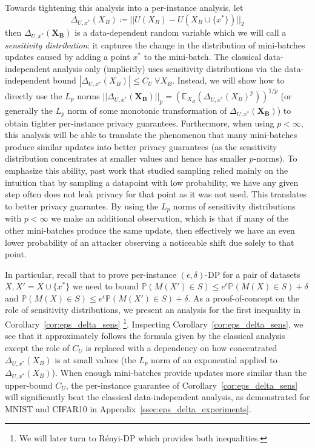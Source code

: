 Towards tightening this analysis into a per-instance analysis, let $$\Delta_{U,x^*}(X_B) \coloneqq ||U(X_B) - U(X_B \cup \{x^*\})||_2$$
then $\Delta_{U,x^*}(\mathbf{X_B})$ is a data-dependent random variable which we will call a \emph{sensitivity distribution}: it captures the change in the distribution of mini-batches updates caused by adding a point $x^*$ to the mini-batch. The classical data-independent analysis only (implicitly) uses sensitivity distributions via the data-independent bound $|\Delta_{U,x^*}(X_B)| \leq C_{U}~\forall X_B$. Instead, we will show how to directly use the $L_p$ norms $||\Delta_{U,x^*}(\mathbf{X_B})||_{p} = (\mathbb{E}_{X_B} (\Delta_{U,x^*}(X_B)^p))^{1/p}$ (or generally the $L_p$ norm of some monotonic transformation of $\Delta_{U,x^*}(\mathbf{X_B})$) to obtain tighter per-instance privacy guarantees. Furthermore, when using $p < \infty$, this analysis will be able to translate the phenomenon that many mini-batches produce similar updates into better privacy guarantees (as the sensitivity distribution concentrates at smaller values and hence has smaller $p$-norms). To emphasize this ability, past work that studied sampling relied mainly on the intuition that by sampling a datapoint with low probability, we have any given step often does not leak privacy for that point as it was not used. This translates to better privacy guarantes. By using the $L_p$ norms of sensitivity distributions with $p< \infty$ we make an additional observation, which is that if many of the other mini-batches produce the same update, then effectively we have an even lower probability of an attacker observing a noticeable shift due solely to that point.  %


In particular, recall that to prove per-instance $(\epsilon,\delta)$-DP for a pair of datasets $X,X'= X \cup \{x^*\}$ we need to bound $\mathbb{P}(M(X') \in S) \leq e^{\epsilon} \mathbb{P}(M(X) \in S) + \delta$ and $\mathbb{P}(M(X) \in S) \leq e^{\epsilon} \mathbb{P}(M(X') \in S) + \delta$. As a proof-of-concept on the role of sensitivity distributions, we present an analysis for the first inequality in Corollary~\ref{cor:eps_delta_sens} \footnote{We will later turn to R\'enyi-DP which provides both inequalities.}. Inspecting Corollary~\ref{cor:eps_delta_sens}, we see that it approximately follows the formula given by the classical analysis except the role of $C_U$ is replaced with a dependency on how concentrated $\Delta_{U,x^*}(X_B)$ is at small values (the $L_p$ norm of an exponential applied to $\Delta_{U,x^*}(X_B)$). When enough mini-batches provide updates more similar than the upper-bound $C_U$, the per-instance guarantee of Corollary~\ref{cor:eps_delta_sens} will significantly beat the classical data-independent analysis, as demonstrated for MNIST and CIFAR10 in Appendix~\ref{ssec:eps_delta_experiments}.




